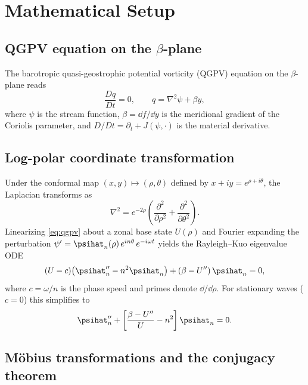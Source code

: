 \section{Mathematical Setup}
\label{sec:setup}

\subsection{QGPV equation on the \texorpdfstring{$\beta$}{beta}-plane}

The barotropic quasi-geostrophic potential vorticity (QGPV) equation on the
$\beta$-plane reads
\begin{equation}\label{eq:qgpv}
  \frac{Dq}{Dt} = 0, \qquad q = \nabla^2\psi + \beta y,
\end{equation}
where $\psi$ is the stream function, $\beta = \dd f/\dd y$ is the
meridional gradient of the Coriolis parameter, and $D/Dt = \partial_t +
J(\psi, \cdot)$ is the material derivative.

\subsection{Log-polar coordinate transformation}

Under the conformal map $(x,y) \mapsto (\rho,\theta)$ defined by
$x + iy = e^{\rho + i\theta}$, the Laplacian transforms as
\begin{equation}\label{eq:laplacian-logpolar}
  \nabla^2 = e^{-2\rho}\!\left(
    \frac{\partial^2}{\partial\rho^2} +
    \frac{\partial^2}{\partial\theta^2}
  \right).
\end{equation}
Linearizing \eqref{eq:qgpv} about a zonal base state $U(\rho)$ and Fourier
expanding the perturbation $\psi' = \psihat_n(\rho)\,e^{in\theta}\,
e^{-i\omega t}$ yields the Rayleigh--Kuo eigenvalue ODE
\begin{equation}\label{eq:rayleigh-kuo}
  (U - c)\bigl(\psihat_n'' - n^2 \psihat_n\bigr)
  + (\beta - U'')\,\psihat_n = 0,
\end{equation}
where $c = \omega/n$ is the phase speed and primes denote $\dd/\dd\rho$.
For stationary waves ($c = 0$) this simplifies to
\begin{equation}\label{eq:stationary-ode}
  \psihat_n'' + \left[\frac{\beta - U''}{U} - n^2\right] \psihat_n = 0.
\end{equation}

\subsection{M\"obius transformations and the conjugacy theorem}
\label{sec:mobius-conjugacy}

